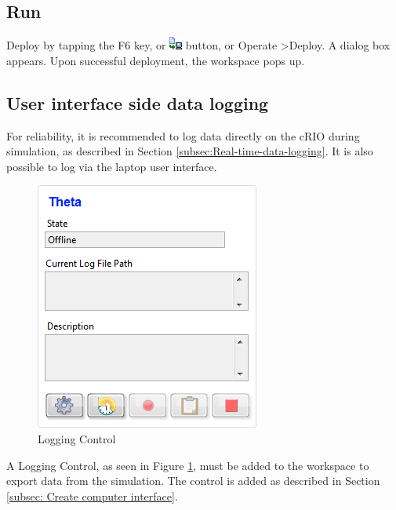 \documentclass[a4paper,twoside,english]{report}
\begin{document}
\subsection{Run}

Deploy by tapping the F6 key, or \includegraphics[scale=0.8]{fig/veristand_deploy}
button, or Operate \textgreater  Deploy. A dialog box appears. Upon
successful deployment, the workspace pops up.

\subsection{User interface side data logging}

For reliability, it is recommended to log data directly on the cRIO
during simulation, as described in Section \ref{subsec:Real-time-data-logging}.
It is also possible to log via the laptop user interface.

\begin{figure}[h]
\centering \includegraphics[scale=0.45]{fig/veristand_ws_logging} \caption{Logging Control}

\label{fig: veristand workspace logging control} 
\end{figure}

A Logging Control, as seen in Figure \ref{fig: veristand workspace logging control},
must be added to the workspace to export data from the simulation.
The control is added as described in Section \ref{subsec: Create computer interface}.
\end{document}
